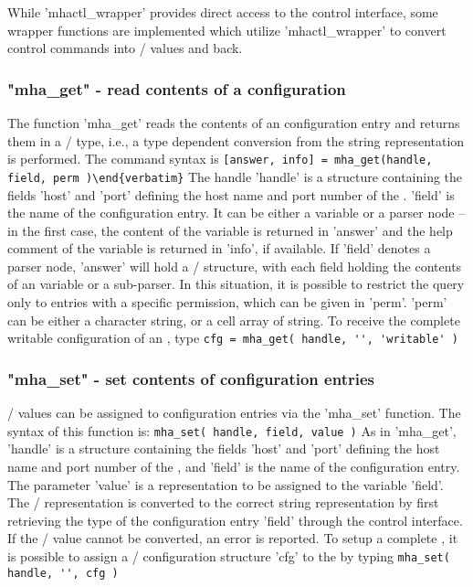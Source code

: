 While 'mhactl\_wrapper' provides direct access to the \mha{} control interface,
some wrapper functions are implemented which utilize 'mhactl\_wrapper' to
convert \mha{} control commands into \Octave{}/ \Matlab{} values and back.

\subsubsection{"mha\_get" - read contents of a \mha configuration}

The function 'mha\_get' reads the contents of an \mha{} configuration
entry and returns them in a \Octave{}/ \Matlab{} type, i.e., a type dependent
conversion from the \mha{} string representation is performed. The
command syntax is
\verb![answer, info] = mha_get(handle, field, perm )\end{verbatim}!
The \mha{} handle 'handle' is a structure containing the fields 'host'
and 'port' defining the host name and port number of the \mhad{}.
%
'field' is the name of the \mha{} configuration entry.
%
It can be either a variable or a parser node -- in the first case, the
content of the variable is returned in 'answer' and the help comment
of the variable is returned in 'info', if available.
%
If 'field' denotes a parser node, 'answer' will hold a \Octave{}/ \Matlab{}
structure, with each field holding the contents of an \mha{} variable or a
sub-parser.
%
In this situation, it is possible to restrict the query only to
entries with a specific permission, which can be given in 'perm'.
%
'perm' can be either a character string, or a cell array of string.
%
To receive the complete writable configuration of an \mhad{}, type
\verb!cfg = mha_get( handle, '', 'writable' )!
%

\subsubsection{"mha\_set" - set contents of \mha{} configuration entries}

\Octave{}/ \Matlab{} values can be assigned to \mha{} configuration entries via the
'mha\_set' function.
%
The syntax of this function is:
\verb!mha_set( handle, field, value )!
%
As in 'mha\_get', 'handle' is a structure containing the fields 'host'
and 'port' defining the host name and port number of the \mhad{}, and
'field' is the name of the \mha{} configuration entry.
%
The parameter 'value' is a \Matlab{} representation to be assigned to
the variable 'field'.
%
The \Octave{}/ \Matlab{} representation is converted to the correct \mha{} string
representation by first retrieving the type of the configuration entry
'field' through the control interface.
%
If the \Octave{}/ \Matlab{} value cannot be converted, an error is reported.
%
To setup a complete \mha{}, it is possible to assign a \Octave{}/ \Matlab{}
configuration structure 'cfg' to the \mha{} by typing
\verb!mha_set( handle, '', cfg )!

